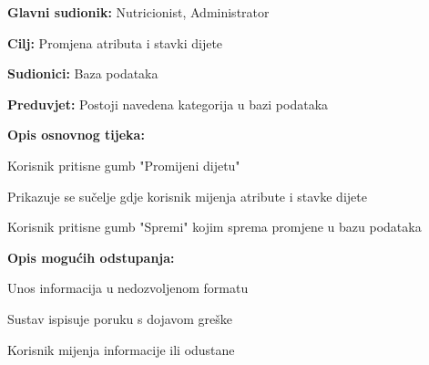                     \noindent {}
                    \begin{packed_item}
    
                        \item \textbf{Glavni sudionik: }Nutricionist, Administrator
                        \item  \textbf{Cilj:} Promjena atributa i stavki dijete
                        \item  \textbf{Sudionici:} Baza podataka
                        \item  \textbf{Preduvjet:} Postoji navedena kategorija u bazi podataka
                        \item  \textbf{Opis osnovnog tijeka:} 
                        
                        \item[] \begin{packed_enum}
    
                            \item Korisnik pritisne gumb "Promijeni dijetu"
                            \item Prikazuje se sučelje gdje korisnik mijenja atribute i stavke dijete
                            \item Korisnik pritisne gumb "Spremi" kojim sprema promjene u bazu podataka
                        \end{packed_enum}
                        
                        \item  \textbf{Opis mogućih odstupanja:}
                        
                        \item[] \begin{packed_item}

                            \item[2.a] Unos informacija u nedozvoljenom formatu
                            \item[] \begin{packed_enum}
                                
                                \item Sustav ispisuje poruku s dojavom greške
                                \item Korisnik mijenja informacije ili odustane
                                
                            \end{packed_enum}

                            
                        \end{packed_item}
                    \end{packed_item}


